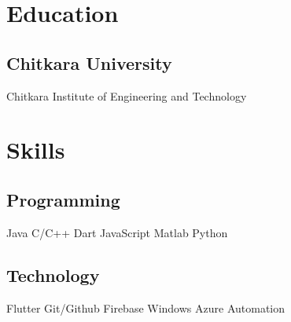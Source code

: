 \documentclass[]{deedy-resume-reversed}
\begin{document}
\begin{minipage}[t]{0.35\textwidth}


\section{Education}

\subsection{Chitkara University}
Chitkara Institute of Engineering and Technology \\
\sectionsep


\section{Skills}
\subsection{Programming}
Java \textbullet{} C/C++ 
Dart \textbullet{} JavaScript 
Matlab Python \\
\sectionsep

\subsection{Technology}
Flutter \textbullet{} Git/Github \textbullet{} Firebase \textbullet{} Windows Azure \textbullet{} Automation \\
\sectionsep




\end{minipage}
\end{document}
